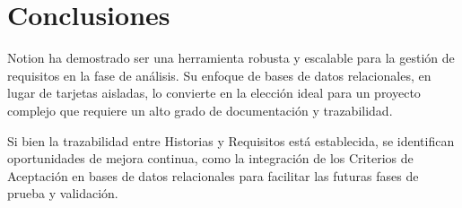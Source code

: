 \section{Conclusiones}
Notion ha demostrado ser una herramienta robusta y escalable para la gestión de requisitos en la fase de análisis. Su enfoque de bases de datos relacionales, en lugar de tarjetas aisladas, lo convierte en la elección ideal para un proyecto complejo que requiere un alto grado de documentación y trazabilidad.

Si bien la trazabilidad entre Historias y Requisitos está establecida, se identifican oportunidades de mejora continua, como la integración de los Criterios de Aceptación en bases de datos relacionales para facilitar las futuras fases de prueba y validación.

